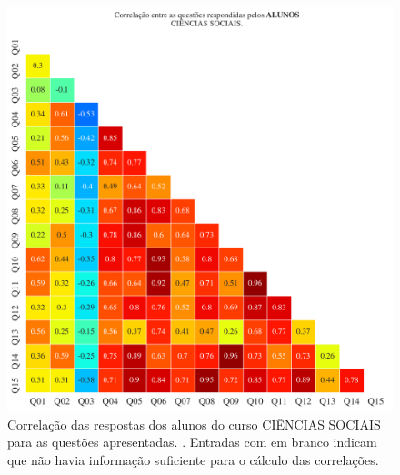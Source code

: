 \documentclass[a4paper,10pt]{article}
\begin{document}
\begin{figure}[h]
\centering
\includegraphics[width=0.999\linewidth]{matriz_corr__alunos_313087.png}
\caption{\label{fig:corr_alunos}Correlação das respostas dos alunos do curso CIÊNCIAS SOCIAIS para as questões apresentadas. . Entradas com em branco indicam que não havia informação suficiente para o cálculo das correlações.}
\end{figure}
\end{document}
